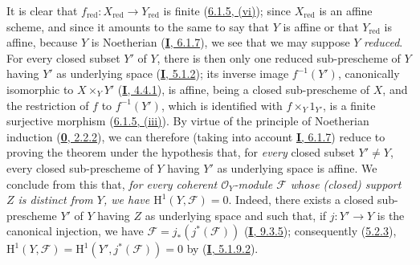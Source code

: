 It is clear that
$f_{\mathrm{red}}:X_{\mathrm{red}}\to Y_{\mathrm{red}}$ is finite
(\hyperref[II.6.1.5]{6.1.5, (vi)}); since $X_{\mathrm{red}}$ is an
affine scheme, and since it amounts to the same to say that $Y$ is affine or
that $Y_{\mathrm{red}}$ is affine, because $Y$ is Noetherian
(\hyperref[I.6.1.7]{\textbf{I}, 6.1.7}), we see that we may suppose $Y$
\emph{reduced}. For every closed subset $Y'$ of $Y$, there is then only one
reduced sub-prescheme of $Y$ having $Y'$ as underlying space
(\hyperref[I.5.1.2]{\textbf{I}, 5.1.2}); its inverse image $f^{-1}(Y')$,
canonically isomorphic to $X\times_Y Y'$
(\hyperref[I.4.4.1]{\textbf{I}, 4.4.1}), is affine, being a closed sub-prescheme of
$X$, and the restriction of $f$ to $f^{-1}(Y')$, which is identified with
$f\times_Y 1_{Y'}$, is a finite surjective morphism
(\hyperref[II.6.1.5]{6.1.5, (iii)}). By virtue of the principle of
Noetherian induction (\hyperref[0.2.2.2]{\textbf{0}, 2.2.2}), we can therefore
(taking into account
\hyperref[I.6.1.7]{\textbf{I}, 6.1.7}) reduce to proving the theorem under
the hypothesis that, for \emph{every} closed subset $Y'\neq Y$, every
closed sub-prescheme of $Y$ having $Y'$ as underlying space is affine.
We conclude from this that, \emph{for every coherent $\mathcal{O}_Y$-module
$\mathcal{F}$ whose (closed) support $Z$ is distinct from $Y$, we have
$\mathrm{H}^1(Y,\mathcal{F})=0$}. Indeed, there exists a closed sub-prescheme
$Y'$ of $Y$ having $Z$ as underlying space and such that, if $j:Y'\to Y$ is
the canonical injection, we have
$\mathcal{F}=j_*(j^*(\mathcal{F}))$
(\hyperref[I.9.3.5]{\textbf{I}, 9.3.5}); consequently
(\hyperref[II.5.2.3]{5.2.3}),
$\mathrm{H}^1(Y,\mathcal{F})
=\mathrm{H}^1(Y',j^*(\mathcal{F}))=0$ by
(\hyperref[I.5.1.9.2]{\textbf{I}, 5.1.9.2}).

